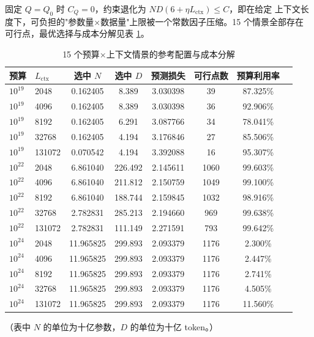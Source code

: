 \documentclass[bwprint]{gmcmthesis}
\numberwithin{equation}{section}
\numberwithin{figure}{section}
\numberwithin{table}{section}
\begin{document}
固定 $Q=Q_0$ 时 $C_Q=0$，约束退化为 $ND(6+\eta L_{\mathrm{ctx}})\le C$，即在给定
上下文长度下，可负担的"参数量×数据量"上限被一个常数因子压缩。15 个情景全部存在
可行点，最优选择与成本分解见表 \ref{tab:q3-frontier}。

\begin{table}[htp!]
\centering
\renewcommand\arraystretch{1.2}
\caption{15 个预算×上下文情景的参考配置与成本分解}\label{tab:q3-frontier}
\begin{tabular*}{\textwidth}{@{\extracolsep{\fill}}llcccccc@{}}
\toprule
预算 & $L_{\mathrm{ctx}}$ & 选中 $N$ & 选中 $D$ & 预测损失 & 可行点数 & 预算利用率 \\
\midrule
$10^{19}$ & 2048   & 0.162405 & 8.389   & 3.030398 & 39   & 87.325\% \\
$10^{19}$ & 4096   & 0.162405 & 8.389   & 3.030398 & 36   & 92.906\% \\
$10^{19}$ & 8192   & 0.162405 & 6.291   & 3.087766 & 34   & 78.041\% \\
$10^{19}$ & 32768  & 0.162405 & 4.194   & 3.176846 & 27   & 85.506\% \\
$10^{19}$ & 131072 & 0.070542 & 4.194   & 3.392088 & 16   & 95.307\% \\
$10^{22}$ & 2048   & 6.861040 & 226.492 & 2.145611 & 1060 & 99.603\% \\
$10^{22}$ & 4096   & 6.861040 & 211.812 & 2.150759 & 1049 & 99.100\% \\
$10^{22}$ & 8192   & 6.861040 & 188.744 & 2.159845 & 1032 & 98.916\% \\
$10^{22}$ & 32768  & 2.782831 & 285.213 & 2.194660 & 969  & 99.638\% \\
$10^{22}$ & 131072 & 2.782831 & 111.149 & 2.271591 & 793  & 99.642\% \\
$10^{24}$ & 2048   & 11.965825 & 299.893 & 2.093379 & 1176 & 2.300\% \\
$10^{24}$ & 4096   & 11.965825 & 299.893 & 2.093379 & 1176 & 2.447\% \\
$10^{24}$ & 8192   & 11.965825 & 299.893 & 2.093379 & 1176 & 2.741\% \\
$10^{24}$ & 32768  & 11.965825 & 299.893 & 2.093379 & 1176 & 4.505\% \\
$10^{24}$ & 131072 & 11.965825 & 299.893 & 2.093379 & 1176 & 11.560\% \\
\bottomrule
\end{tabular*}
\end{table}

（表中 $N$ 的单位为十亿参数，$D$ 的单位为十亿 token。）
\end{document}
